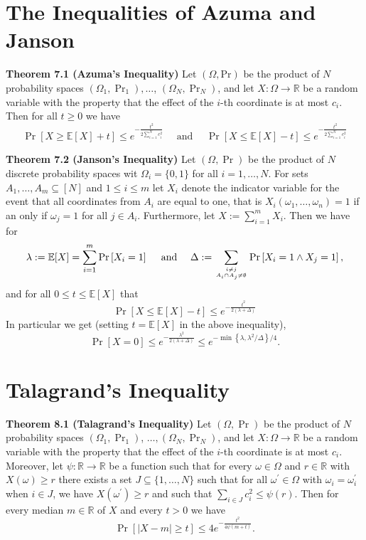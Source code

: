 \section{The Inequalities of Azuma and Janson}
\textbf{Theorem 7.1 (Azuma's Inequality)} Let $(\Omega, \mathrm{Pr})$ be the product of $N$ probability spaces $\left(\Omega_{1}, \operatorname{Pr}_{1}\right), \ldots$, $\left(\Omega_{N}, \operatorname{Pr}_{N}\right)$, and let $X: \Omega \rightarrow \mathbb{R}$ be a random variable with the property that the effect of the $i$-th coordinate is at most $c_{i}$. Then for all $t \geq 0$ we have
$$
\operatorname{Pr}[X \geq \mathbb{E}[X]+t] \leq e^{-\frac{t^{2}}{2 \sum_{i=1}^{N} c_{i}^{2}}} \quad \text { and } \quad \operatorname{Pr}[X \leq \mathbb{E}[X]-t] \leq e^{-\frac{t^{2}}{2 \sum_{i=1}^{N} c_{i}^{2}}}
$$

\textbf{Theorem 7.2 (Janson's Inequality)} Let $(\Omega, \operatorname{Pr})$ be the product of $N$ discrete probability spaces wit $\Omega_{i}=\{0,1\}$ for all $i=1, \ldots, N$. For sets $A_{1}, \ldots, A_{m} \subseteq[N]$ and $1 \leq i \leq m$ let $X_{i}$ denote the indicator variable for the event that all coordinates from $A_{i}$ are equal to one, that is $X_{i}\left(\omega_{1}, \ldots, \omega_{n}\right)=1$ if an only if $\omega_{j}=1$ for all $j \in A_{i}$. Furthermore, let $X:=\sum_{i=1}^{m} X_{i}$. Then we have for
$$
\lambda:=\mathbb{E}[X]=\sum_{i=1}^{m} \operatorname{Pr}\left[X_{i}=1\right] \quad \text { and } \quad \Delta:=\sum_{i \neq j \atop A_{i} \cap A_{j} \neq \emptyset} \operatorname{Pr}\left[X_{i}=1 \wedge X_{j}=1\right],
$$
and for all $0 \leq t \leq \mathbb{E}[X]$ that
$$
\operatorname{Pr}[X \leq \mathbb{E}[X]-t] \leq e^{-\frac{t^{2}}{2(\lambda+\Delta)}}
$$
In particular we get (setting $t=\mathbb{E}[X]$ in the above inequality),
$$
\operatorname{Pr}[X=0] \leq e^{-\frac{\lambda^{2}}{2(\lambda+\Delta)}} \leq e^{-\min \left\{\lambda, \lambda^{2} / \Delta\right\} / 4} .
$$

\section{Talagrand’s Inequality}
\textbf{Theorem 8.1 (Talagrand's Inequality)} 
Let $(\Omega, \operatorname{Pr})$ be the product of $N$ probability spaces $\left(\Omega_{1}, \operatorname{Pr}_{1}\right)$, $\ldots,\left(\Omega_{N}, \operatorname{Pr}_{N}\right)$, and let $X: \Omega \rightarrow \mathbb{R}$ be a random variable with the property that the effect of the $i$-th coordinate is at most $c_{i}$. Moreover, let $\psi: \mathbb{R} \rightarrow \mathbb{R}$ be a function such that for every $\omega \in \Omega$ and $r \in \mathbb{R}$ with $X(\omega) \geq r$ there exists a set $J \subseteq\{1, \ldots, N\}$ such that for all $\omega^{\prime} \in \Omega$ with $\omega_{i}=\omega_{i}^{\prime}$ when $i \in J$, we have $X\left(\omega^{\prime}\right) \geq r$ and such that $\sum_{i \in J} c_{i}^{2} \leq \psi(r)$.
Then for every median $m \in \mathbb{R}$ of $X$ and every $t>0$ we have
$$
\operatorname{Pr}[|X-m| \geq t] \leq 4 e^{-\frac{t^{2}}{4 \psi(m+t)}} .
$$

